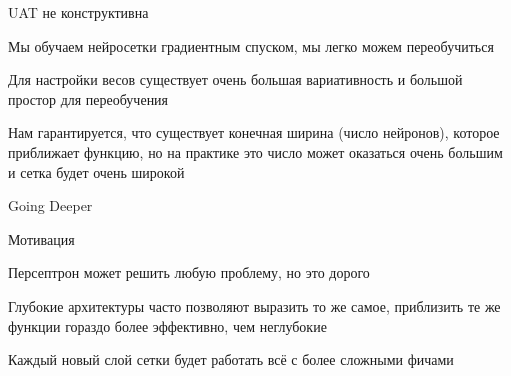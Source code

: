 \documentclass[notes,12pt, aspectratio=169]{beamer}
\newenvironment{wideitemize}{\itemize\addtolength{\itemsep}{10pt}}{\enditemize}
\begin{document}
\begin{frame}{UAT не конструктивна}
		\begin{wideitemize}		
			\item Мы обучаем нейросетки градиентным спуском, мы легко можем переобучиться
			\item Для настройки весов существует очень большая вариативность и большой простор для переобучения 
			\item Нам гарантируется, что существует конечная ширина (число нейронов), которое приближает функцию, но на практике это число может оказаться очень большим и сетка будет очень широкой
		\end{wideitemize}
\end{frame}


{
	\begin{frame}[fragile]
	\vspace{6.5cm}
	\begin{center}
		{\color{white} \Huge{Going Deeper}}
	\end{center}
\end{frame}
}


\begin{frame}{Мотивация}
	\begin{wideitemize}
		\item Персептрон может решить любую проблему, но это дорого
		
		\item Глубокие архитектуры часто позволяют выразить то же самое, приблизить те же функции гораздо более эффективно, чем неглубокие
		
		\item Каждый новый слой сетки будет работать всё с более сложными фичами
	\end{wideitemize}
\end{frame}
\end{document}
